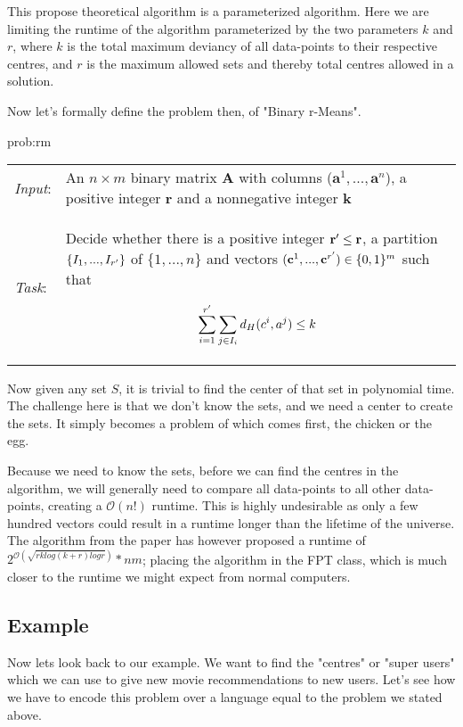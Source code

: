 \documentclass[a4paper]{article}
\begin{document}
This propose theoretical algorithm is a parameterized algorithm. Here we are limiting the runtime of the
algorithm parameterized by the two parameters $k$ and $r$, where $k$ is the total maximum deviancy 
of all data-points to their respective centres, and $r$ is the maximum allowed sets and 
thereby total centres allowed in a solution.

\newpage

Now let's formally define the problem then, of "Binary r-Means".
\begin{problem}{prob:rm}
\begin{tabular}{p{}p{}}
    \textit{Input}: & An $n \times m$ binary matrix \textbf{A} with columns
    ($\textbf{a}^1,...,\textbf{a}^n$), a positive integer $\textbf{r}$ and a nonnegative
    integer $\textbf{k}$                                                                     \\

    \textit{Task}:  & Decide whether there is a positive integer $\textbf{r}\sp{\prime} \leq
        \textbf{r}$, a partition $\{I_1, ..., I_{r\sp{\prime}}\}$ of $\{1,...,n\}$ and vectors
    $(\textbf{c}^1,...,\textbf{c}^{r\sp{\prime}}) \in \{0,1\}^m$ such that

    \[
        \sum_{i = 1}^{r\sp{\prime}} \sum_{j \in I_i} d_H(c^i, a^j) \leq k
    \]
\end{tabular}
\end{problem}

Now given any set $S$, it is trivial to find the center of that set in polynomial time. The challenge
here is that we don't know the sets, and we need a center to create the sets. It simply becomes a problem
of which comes first, the chicken or the egg.

Because we need to know the sets, before we can find the centres in the algorithm, we will
generally need to compare all data-points to all other data-points, creating a $\mathcal{O}(n!)$ runtime. This
is highly undesirable as only a few hundred vectors could result in a runtime longer than the lifetime
of the universe. The algorithm from the paper \cite{fomin_golovach_panolan_2020} has however proposed a 
runtime of $2^{\mathcal{O} (\sqrt{rk log(k+r) logr})}*nm$; placing the algorithm in the FPT class, which is
much closer to the runtime we might expect from normal computers.

\subsection{Example}
Now lets look back to our example. We want to find the "centres" or "super users" which we can use to 
give new movie recommendations to new users. Let's see how we have to encode this problem over a language
equal to the problem we stated above.
\end{document}
